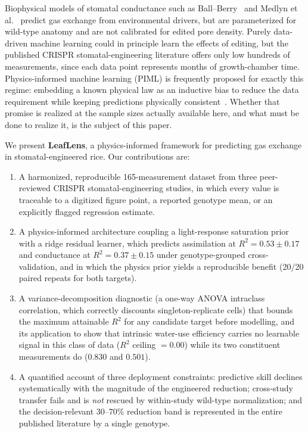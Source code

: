 \documentclass[runningheads]{llncs}
\begin{document}
Biophysical models of stomatal conductance such as Ball--Berry~\cite{ref_ball_berry} and Medlyn et al.~\cite{ref_medlyn} predict gas exchange from environmental drivers, but are parameterized for wild-type anatomy and are not calibrated for edited pore density. Purely data-driven machine learning could in principle learn the effects of editing, but the published CRISPR stomatal-engineering literature offers only low hundreds of measurements, since each data point represents months of growth-chamber time. Physics-informed machine learning (PIML) is frequently proposed for exactly this regime: embedding a known physical law as an inductive bias to reduce the data requirement while keeping predictions physically consistent~\cite{ref_karniadakis,ref_willard}. Whether that promise is realized at the sample sizes actually available here, and what must be done to realize it, is the subject of this paper.

We present \textbf{LeafLens}, a physics-informed framework for predicting gas exchange in stomatal-engineered rice. Our contributions are:

\begin{enumerate}
    \item A harmonized, reproducible 165-measurement dataset from three peer-reviewed CRISPR stomatal-engineering studies, in which every value is traceable to a digitized figure point, a reported genotype mean, or an explicitly flagged regression estimate.
    \item A physics-informed architecture coupling a light-response saturation prior with a ridge residual learner, which predicts assimilation at $R^{2}=0.53\pm0.17$ and conductance at $R^{2}=0.37\pm0.15$ under genotype-grouped cross-validation, and in which the physics prior yields a reproducible benefit (20/20 paired repeats for both targets).
    \item A variance-decomposition diagnostic (a one-way ANOVA intraclass correlation, which correctly discounts singleton-replicate cells) that bounds the maximum attainable $R^{2}$ for any candidate target before modelling, and its application to show that intrinsic water-use efficiency carries no learnable signal in this class of data ($R^{2}$ ceiling $=0.00$) while its two constituent measurements do ($0.830$ and $0.501$).
    \item A quantified account of three deployment constraints: predictive skill declines systematically with the magnitude of the engineered reduction; cross-study transfer fails and is \emph{not} rescued by within-study wild-type normalization; and the decision-relevant 30--70\% reduction band is represented in the entire published literature by a single genotype.
\end{enumerate}
\end{document}
